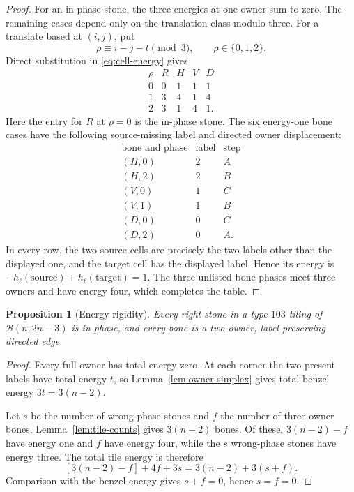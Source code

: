 \documentclass[11pt]{amsart}
\newtheorem{proposition}[theorem]{Proposition}
\theoremstyle{definition}
\newcommand{\Bz}{\mathcal B}
\begin{document}
\begin{proof}
For an in-phase stone, the three energies at one owner sum to zero.  The
remaining cases depend only on the translation class modulo three.  For a
translate based at $(i,j)$, put
\[
 \rho\equiv i-j-t\pmod3,\qquad \rho\in\{0,1,2\}.
\]
Direct substitution in \eqref{eq:cell-energy} gives
\[
\begin{array}{c|cccc}
\rho& R&H&V&D\\ \hline
0&0&1&1&1\\
1&3&4&1&4\\
2&3&1&4&1.
\end{array}
\]
Here the entry for $R$ at $\rho=0$ is the in-phase stone.  The six
energy-one bone cases have the following source-missing label and directed
owner displacement:
\[
\begin{array}{c|cc}
\text{bone and phase}&\text{label}&\text{step}\\ \hline
(H,0)&2&A\\
(H,2)&2&B\\
(V,0)&1&C\\
(V,1)&1&B\\
(D,0)&0&C\\
(D,2)&0&A.
\end{array}
\]
In every row, the two source cells are precisely the two labels other than
the displayed one, and the target cell has the displayed label.  Hence its
energy is $-h_\ell(\text{source})+h_\ell(\text{target})=1$.  The three
unlisted bone phases meet three owners and have energy four, which completes
the table.
\end{proof}

\begin{proposition}[Energy rigidity]\label{prop:energy-rigidity}
Every right stone in a type-$103$ tiling of $\Bz(n,2n-3)$ is in phase, and
every bone is a two-owner, label-preserving directed edge.
\end{proposition}

\begin{proof}
Every full owner has total energy zero.  At each corner the two present labels
have total energy $t$, so Lemma~\ref{lem:owner-simplex} gives total benzel
energy $3t=3(n-2)$.

Let $s$ be the number of wrong-phase stones and $f$ the number of three-owner
bones.  Lemma~\ref{lem:tile-counts} gives $3(n-2)$ bones.  Of these,
$3(n-2)-f$ have energy one and $f$ have energy four, while the $s$
wrong-phase stones have energy three.  The total tile energy is therefore
\[
 [3(n-2)-f]+4f+3s=3(n-2)+3(s+f).
\]
Comparison with the benzel energy gives $s+f=0$, hence $s=f=0$.
\end{proof}
\end{document}
